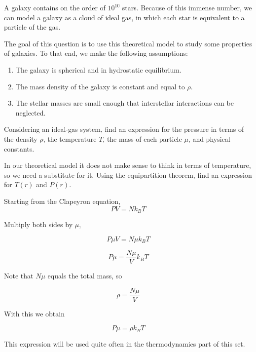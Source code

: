 \documentclass[11pt]{article}
\begin{document}
\begin{pproblem}
    A galaxy contains on the order of \(10^{10}\) stars. Because of this immense number, we can model a galaxy as a cloud of ideal gas, in which each star is equivalent to a particle of the gas.
    
    The goal of this question is to use this theoretical model to study some properties of galaxies. To that end, we make the following assumptions:

    \begin{enumerate}[label=\roman*)]
        \item The galaxy is spherical and in hydrostatic equilibrium.
        \item The mass density of the galaxy is constant and equal to \(\rho\).
        \item The stellar masses are small enough that interstellar interactions can be neglected.
    \end{enumerate}
    
    \begin{alternativas}
        \item Considering an ideal-gas system, find an expression for the pressure in terms of the density \(\rho\), the temperature \(T\), the mass of each particle \(\mu\), and physical constants.
        
        \item In our theoretical model it does not make sense to think in terms of temperature, so we need a substitute for it. Using the equipartition theorem, find an expression for \(T(r)\) and \(P(r)\).
    \end{alternativas}
\begin{pssolution*}{}{}
    \begin{alternativas}
        \item Starting from the Clapeyron equation,
        \[PV = Nk_BT\]

        Multiply both sides by \(\mu\),

        \[P\mu V = N\mu k_B T\]

        \[P\mu = \frac{N\mu}{V}k_BT\]

        Note that \(N\mu\) equals the total mass, so

        \[\rho = \frac{N\mu}{V}\]
        
        With this we obtain

        \[\boxed{P\mu = \rho k_B T}\]

        This expression will be used quite often in the thermodynamics part of this set.


\end{alternativas}
\end{pssolution*}
\end{pproblem}
\end{document}
